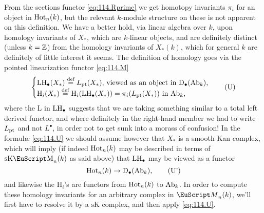 From the sections functor \eqref{eq:114.Rprime} we get homotopy
invariants $\pi_i$ for an object in $\operatorname{Hot}_n(k)$, but the relevant
$k$-module structure on these is not apparent on this definition. We
have a better hold, via linear algebra over $k$, upon homology
invariants of $X_*$, which are $k$-linear objects, and are definitely
distinct (unless $k={\mathbb{Z}}$) from the homology invariants of $X_*(k)$,
which for general $k$ are definitely of little interest it seems. The
definition of homology goes via the pointed linearization functor
\eqref{eq:114.M}
\begin{equation}
  \label{eq:114.U}
  \left\{\begin{tabular}{@{}l@{}}
    $\LH_\bullet(X_*) \eqdef L\subpt(X_*)$, viewed as an object
      in $\D_\bullet(\AbOf_k)$, \\
    $\mathrm H_i(X_*) \eqdef \mathrm H_i(\LH_\bullet(X_*)) =
      \pi_i(L\subpt(X_*))$ in $\AbOf_k$,
  \end{tabular}\right.\tag{U}
\end{equation}
where the $\mathrm L$ in $\operatorname{LH}_\bullet$ suggests that we
are taking something similar to a total left derived functor, and
where definitely in the right-hand member we had to write $L_{\mathrm{pt}}$
and not $L^\bullet$, in order not to get sunk into a morass of
confusion! In the formulæ \eqref{eq:114.U} we should assume however
that $X_*$ is a smooth Kan complex, which will imply (if indeed
$\operatorname{Hot}_n(k)$ may be described in terms of $\sKM_n(k)$ as said above)
that $\operatorname{LH}_\bullet$ may be viewed as a functor
\begin{equation}
  \label{eq:114.Uprime}
  \operatorname{Hot}_n(k)\to{\ensuremath{\mathrm{D}}}_\bullet(\operatorname{Ab}_k),\tag{U'}
\end{equation}
and likewise the $\mathrm H_i$'s are functors from $\operatorname{Hot}_n(k)$ to
$\operatorname{Ab}_k$. In order to compute these homology invariants for an
arbitrary complex in $\scrM_n(k)$, we'll first have to resolve it by a
$\mathrm{sK}$ complex, and then apply \eqref{eq:114.U}.

